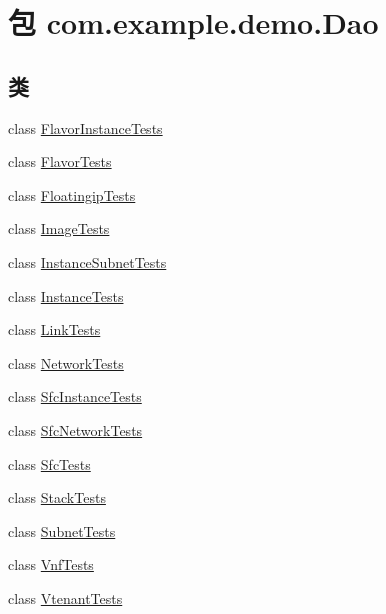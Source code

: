 \hypertarget{namespacecom_1_1example_1_1demo_1_1_dao}{}\section{包 com.\+example.\+demo.\+Dao}
\label{namespacecom_1_1example_1_1demo_1_1_dao}
\subsection*{类}
\begin{DoxyCompactItemize}
\item 
class \mbox{\hyperlink{classcom_1_1example_1_1demo_1_1_dao_1_1_flavor_instance_tests}{Flavor\+Instance\+Tests}}
\item 
class \mbox{\hyperlink{classcom_1_1example_1_1demo_1_1_dao_1_1_flavor_tests}{Flavor\+Tests}}
\item 
class \mbox{\hyperlink{classcom_1_1example_1_1demo_1_1_dao_1_1_floatingip_tests}{Floatingip\+Tests}}
\item 
class \mbox{\hyperlink{classcom_1_1example_1_1demo_1_1_dao_1_1_image_tests}{Image\+Tests}}
\item 
class \mbox{\hyperlink{classcom_1_1example_1_1demo_1_1_dao_1_1_instance_subnet_tests}{Instance\+Subnet\+Tests}}
\item 
class \mbox{\hyperlink{classcom_1_1example_1_1demo_1_1_dao_1_1_instance_tests}{Instance\+Tests}}
\item 
class \mbox{\hyperlink{classcom_1_1example_1_1demo_1_1_dao_1_1_link_tests}{Link\+Tests}}
\item 
class \mbox{\hyperlink{classcom_1_1example_1_1demo_1_1_dao_1_1_network_tests}{Network\+Tests}}
\item 
class \mbox{\hyperlink{classcom_1_1example_1_1demo_1_1_dao_1_1_sfc_instance_tests}{Sfc\+Instance\+Tests}}
\item 
class \mbox{\hyperlink{classcom_1_1example_1_1demo_1_1_dao_1_1_sfc_network_tests}{Sfc\+Network\+Tests}}
\item 
class \mbox{\hyperlink{classcom_1_1example_1_1demo_1_1_dao_1_1_sfc_tests}{Sfc\+Tests}}
\item 
class \mbox{\hyperlink{classcom_1_1example_1_1demo_1_1_dao_1_1_stack_tests}{Stack\+Tests}}
\item 
class \mbox{\hyperlink{classcom_1_1example_1_1demo_1_1_dao_1_1_subnet_tests}{Subnet\+Tests}}
\item 
class \mbox{\hyperlink{classcom_1_1example_1_1demo_1_1_dao_1_1_vnf_tests}{Vnf\+Tests}}
\item 
class \mbox{\hyperlink{classcom_1_1example_1_1demo_1_1_dao_1_1_vtenant_tests}{Vtenant\+Tests}}
\end{DoxyCompactItemize}
